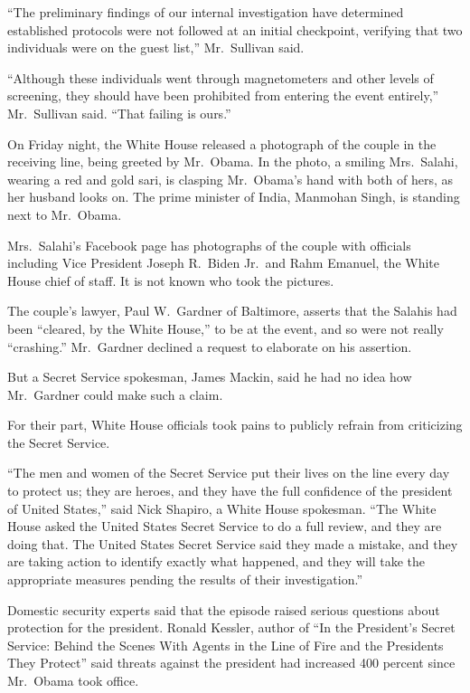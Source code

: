 ﻿\documentclass[12pt]{article}
\begin{document}
``The preliminary findings of our internal investigation have determined established protocols were
not followed at an initial checkpoint, verifying that two individuals were on the guest list,''
Mr.~Sullivan said.

``Although these individuals went through magnetometers and other levels of screening, they should
have been prohibited from entering the event entirely,'' Mr.~Sullivan said. ``That failing is
ours.''

On Friday night, the White House released a photograph of the couple in the receiving line, being
greeted by Mr.~Obama. In the photo, a smiling Mrs.~Salahi, wearing a red and gold sari, is clasping
Mr.~Obama's hand with both of hers, as her husband looks on. The prime minister of India, Manmohan
Singh, is standing next to Mr.~Obama.

Mrs.~Salahi's Facebook page has photographs of the couple with officials including Vice President
Joseph R.~Biden Jr.~and Rahm Emanuel, the White House chief of staff. It is not known who took the
pictures.

The couple's lawyer, Paul W.~Gardner of Baltimore, asserts that the Salahis had been ``cleared, by
the White House,'' to be at the event, and so were not really ``crashing.'' Mr.~Gardner declined a
request to elaborate on his assertion.

But a Secret Service spokesman, James Mackin, said he had no idea how Mr.~Gardner could make such a
claim.

For their part, White House officials took pains to publicly refrain from criticizing the Secret
Service.

``The men and women of the Secret Service put their lives on the line every day to protect us; they
are heroes, and they have the full confidence of the president of United States,'' said Nick
Shapiro, a White House spokesman. ``The White House asked the United States Secret Service to do a
full review, and they are doing that. The United States Secret Service said they made a mistake, and
they are taking action to identify exactly what happened, and they will take the appropriate
measures pending the results of their investigation.''

Domestic security experts said that the episode raised serious questions about protection for the
president. Ronald Kessler, author of ``In the President's Secret Service: Behind the Scenes With
Agents in the Line of Fire and the Presidents They Protect'' said threats against the president had
increased 400 percent since Mr.~Obama took office.
\end{document}
